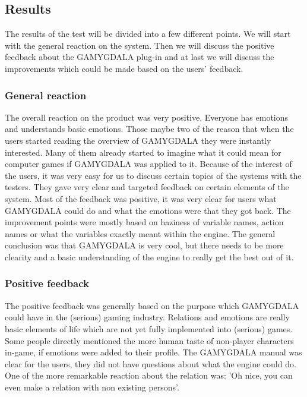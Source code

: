\documentclass[12pt,a4paper]{article}
\begin{document}
\pagebreak

\subsection{Results}
The results of the test will be divided into a few different points. We will start with the general reaction on the system. Then we will discuss the positive feedback about the GAMYGDALA plug-in and at last we will discuss the improvements which could be made based on the users' feedback.

\subsubsection{General reaction}
The overall reaction on the product was very positive. Everyone has emotions and understands basic emotions. Those maybe two of the reason that when the users started reading the overview of GAMYGDALA they were instantly interested. Many of them already started to imagine what it could mean for computer games if GAMYGDALA was applied to it. Because of the interest of the users, it was very easy for us to discuss certain topics of the systems with the testers. They gave very clear and targeted feedback on certain elements of the system. Most of the feedback was positive, it was very clear for users what GAMYGDALA could do and what the emotions were that they got back. The improvement points were mostly based on haziness of variable names, action names or what the variables exactly meant within the engine. The general conclusion was that GAMYGDALA is very cool, but there needs to be more clearity and a basic understanding of the engine to really get the best out of it.

\subsubsection{Positive feedback}
The positive feedback was generally based on the purpose which GAMYGDALA could have in the (serious) gaming industry. Relations and emotions are really basic elements of life which are not yet fully implemented into (serious) games. Some people directly mentioned the more human taste of non-player characters in-game, if emotions were added to their profile. The GAMYGDALA manual was clear for the users, they did not have questions about what the engine could do. One of the more remarkable reaction about the relation was: 'Oh nice, you can even make a relation with non existing persons'. 
\end{document}
